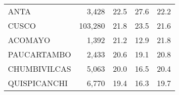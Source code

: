 \begin{tabular}{lrrrr}
	\cellcolor[HTML]{FD6864}ANTA                                            & 3,428                                                                 & 22.5                                                                             & 27.6                                                                        & 22.2                                                                                \\
	\cellcolor[HTML]{FD6864}CUSCO                                           & 103,280                                                               & 21.8                                                                             & 23.5                                                                        & 21.6                                                                                \\
	\cellcolor[HTML]{FD6864}ACOMAYO                                         & 1,392                                                                 & 21.2                                                                             & 12.9                                                                        & 21.8                                                                                \\
	\cellcolor[HTML]{FD6864}PAUCARTAMBO                                     & 2,433                                                                 & 20.6                                                                             & 19.1                                                                        & 20.8                                                                                \\
	\cellcolor[HTML]{FD6864}CHUMBIVILCAS                                    & 5,063                                                                 & 20.0                                                                             & 16.5                                                                        & 20.4                                                                                \\
	\cellcolor[HTML]{FD6864}QUISPICANCHI                                    & 6,770                                                                 & 19.4                                                                             & 16.3                                                                        & 19.7                                                                                \\

\end{tabular}

